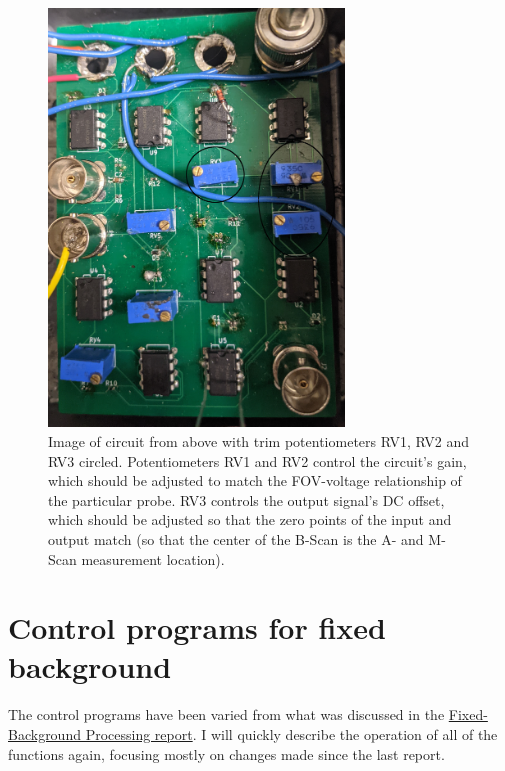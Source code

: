 \documentclass{article}
\begin{document}
\begin{figure}[!h]\label{circ}
	\centering
	\includegraphics[width=0.7\textwidth]{Data for Probe Writeup/circuit.jpg}
	\caption{Image of circuit from above with trim potentiometers RV1, RV2 and RV3 circled. Potentiometers RV1 and RV2 control the circuit's gain, which should be adjusted to match the FOV-voltage relationship of the particular probe. RV3 controls the output signal's DC offset, which should be adjusted so that the zero points of the input and output match (so that the center of the B-Scan is the A- and M-Scan measurement location).}
\end{figure}

\section{Control programs for fixed background}\label{controlprograms}
\hypertarget{controlprograms}{}

\par{The control programs have been varied from what was discussed in the \href{https://github.com/Brian-Frost-LaPlante/LabReports/blob/main/ProbeReports/Fixed-BackgroundProcessing.pdf}{Fixed-Background Processing report}. I will quickly describe the operation of all of the functions again, focusing mostly on changes made since the last report.}
\end{document}
